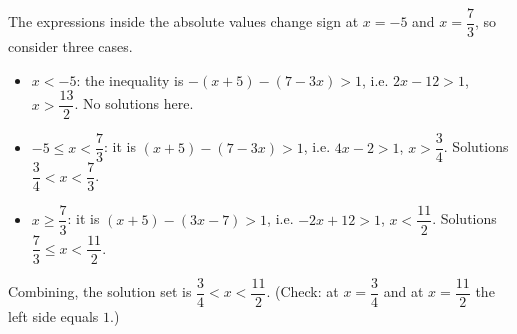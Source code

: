 The expressions inside the absolute values change sign at $x=-5$ and $x=\dfrac{7}{3}$, so consider three cases.
\begin{itemize}
\item $x<-5$: the inequality is $-(x+5)-(7-3x)>1$, i.e. $2x-12>1$, $x>\dfrac{13}{2}$. No solutions here.
\item $-5\le x<\dfrac{7}{3}$: it is $(x+5)-(7-3x)>1$, i.e. $4x-2>1$, $x>\dfrac{3}{4}$. Solutions $\dfrac{3}{4}<x<\dfrac{7}{3}$.
\item $x\ge\dfrac{7}{3}$: it is $(x+5)-(3x-7)>1$, i.e. $-2x+12>1$, $x<\dfrac{11}{2}$. Solutions $\dfrac{7}{3}\le x<\dfrac{11}{2}$.
\end{itemize}
Combining, the solution set is $\boxed{\dfrac{3}{4}<x<\dfrac{11}{2}}$. (Check: at $x=\dfrac{3}{4}$ and at $x=\dfrac{11}{2}$ the left side equals $1$.)
